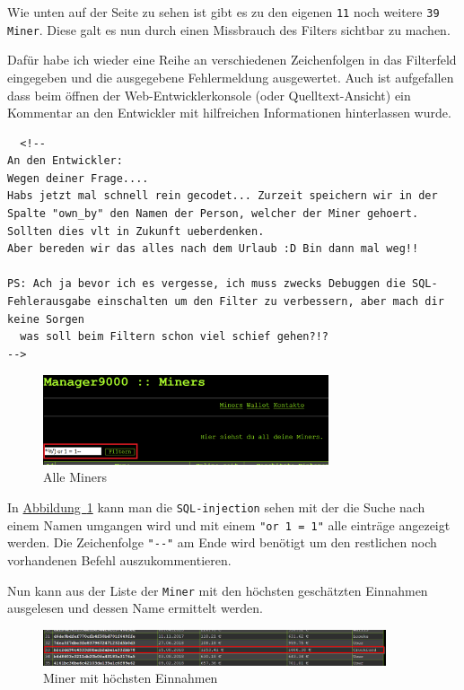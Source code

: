 \documentclass[12pt,a4paper,titlepage,oneside]{scrartcl}
\begin{document}
Wie unten auf der Seite zu sehen ist gibt es zu den eigenen \lstinline{11} noch weitere \lstinline{39 Miner}.
Diese galt es nun durch einen Missbrauch des Filters sichtbar zu machen.

Dafür habe ich wieder eine Reihe an verschiedenen Zeichenfolgen in das Filterfeld eingegeben und die ausgegebene Fehlermeldung ausgewertet.
Auch ist aufgefallen dass beim öffnen der Web-Entwicklerkonsole (oder Quelltext-Ansicht) ein Kommentar an den Entwickler mit hilfreichen Informationen hinterlassen wurde.

\begin{lstlisting}
  <!--
An den Entwickler:
Wegen deiner Frage....
Habs jetzt mal schnell rein gecodet... Zurzeit speichern wir in der Spalte "own_by" den Namen der Person, welcher der Miner gehoert. Sollten dies vlt in Zukunft ueberdenken.
Aber bereden wir das alles nach dem Urlaub :D Bin dann mal weg!!

PS: Ach ja bevor ich es vergesse, ich muss zwecks Debuggen die SQL-Fehlerausgabe einschalten um den Filter zu verbessern, aber mach dir keine Sorgen
  was soll beim Filtern schon viel schief gehen?!?
-->
\end{lstlisting}

\begin{figure}[h!]
  \centering
  \includegraphics[width=0.75\textwidth]{./imgs/manager9000/all_miners_red.png}
\caption{Alle Miners}
\label{fig:all_miners}
\end{figure}

In \hyperref[fig:all_miners]{Abbildung~\ref*{fig:all_miners}} kann man die \lstinline{SQL-injection} sehen mit der die Suche nach einem Namen umgangen wird und mit einem \lstinline{"or 1 = 1"} alle einträge angezeigt werden. Die Zeichenfolge \lstinline{"--"} am Ende wird benötigt um den restlichen noch vorhandenen Befehl auszukommentieren.

Nun kann aus der Liste der \lstinline{Miner} mit den höchsten geschätzten Einnahmen ausgelesen und dessen Name ermittelt werden.

\begin{figure}[h!]
  \centering
  \includegraphics[width=0.9\textwidth]{./imgs/manager9000/highest_miner.png}
\caption{Miner mit höchsten Einnahmen}
\label{fig:highest_miner}
\end{figure}
\end{document}
